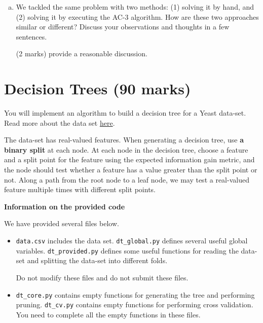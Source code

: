 \documentclass[12pt]{article}
\begin{document}
\begin{enumerate}[(a)]
\begin{markscheme}
\begin{itemize}
    \item (2 marks) for each of the 8 steps.
    \item (2 marks) for the result after 8 steps.
\end{itemize}
\end{markscheme}


\item
We tackled the same problem with two methods: (1) solving it by hand, and (2) solving it by executing the AC-3 algorithm. How are these two approaches similar or different? Discuss your observations and thoughts in a few sentences.

\begin{markscheme}

(2 marks) provide a reasonable discussion.

\end{markscheme}


\end{enumerate}



\newpage
\section{Decision Trees (90 marks)}
\label{question_dt}

You will implement an algorithm to build a decision tree for a Yeast data-set. Read more about the data set  \href{https://archive.ics.uci.edu/ml/datasets/Yeast}{here}.

The data-set has real-valued features. When generating a decision tree, use {\bf a binary split} at each node. At each node in the decision tree, choose a feature and a split point for the feature using the expected information gain metric, and the node should test whether a feature has a value greater than the split point or not. Along a path from the root node to a leaf node, we may test a real-valued feature multiple times with different split points.

{\bf Information on the provided code}

We have provided several files below.
\begin{itemize}

\item \verb+data.csv+ includes the data set. \verb+dt_global.py+ defines several useful global variables. \verb+dt_provided.py+ defines some useful functions for reading the data-set and splitting the data-set into different folds.

Do not modify these files and do not submit these files.

\item \verb+dt_core.py+ contains empty functions for generating the tree and performing pruning. \verb+dt_cv.py+ contains empty functions for performing cross validation. You need to complete all the empty functions in these files.

\end{itemize}
\end{document}
